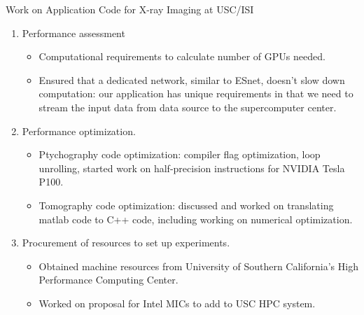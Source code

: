 \begin{frame}{Work on Application Code for X-ray Imaging at USC/ISI} 
\begin{enumerate} 
\item Performance assessment 
\begin{itemize} 
\small \item \small Computational requirements to calculate number of GPUs needed. 
\item \small Ensured that a dedicated network, similar to ESnet, doesn’t slow down computation: our application has unique requirements in that we need to stream the input data from data source to the supercomputer center.
\end{itemize}
\item Performance optimization.
\begin{itemize} 
\small \item \small Ptychography code optimization: compiler flag optimization, loop unrolling, started work on half-precision instructions for NVIDIA Tesla P100.
\item \small Tomography code optimization: discussed and worked on translating matlab code to C++ code, including working on numerical optimization.
\end{itemize}
\item Procurement of resources to set up experiments.
\begin{itemize}
\small \item \small Obtained machine resources from University of Southern California's High Performance Computing Center.
\small \item \small Worked on proposal for Intel MICs to add to USC HPC system.
\end{itemize}
\end{enumerate}
\end{frame} 

